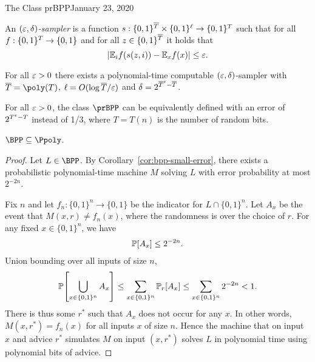 \begin{lecture}{1}{The Class prBPP}{January 23, 2020}


\begin{definition}
  An \emph{$(\varepsilon, \delta)$-sampler} is a function $s :
  \{0,1\}^{\overline{T}} \times \{0,1\}^\ell \to \{0,1\}^T$ such that for
  all $f : \{0,1\}^T \to \{0,1\}$ and for all $z \in
  \{0,1\}^{\overline{T}}$ it holds that \[
    |\mathbb{E}_i f(s(z, i)) - \mathbb{E}_x f(x)| \le \varepsilon.
  \]
\end{definition}

\begin{theorem}
  For all $\varepsilon > 0$ there exists a polynomial-time computable $(\varepsilon,
  \delta)$-sampler with $\overline{T} = \poly(T)$, $\ell = O(\log
  \overline{T}/\varepsilon)$ and $\delta = 2^{\overline{T}^\varepsilon - \overline{T}}$.
\end{theorem}


\begin{corollary}\label{cor:bpp-small-error}
  For all $\varepsilon > 0$, the class $\prBPP$ can be equivalently defined with an
  error of $2^{T^\varepsilon - T}$ instead of 1/3, where $T = T(n)$ is the number of
  random bits.
\end{corollary}

\begin{corollary}
  $\BPP \subseteq \Ppoly$.
\end{corollary}

\begin{proof}
    Let $L \in \BPP$. By Corollary~\ref{cor:bpp-small-error}, there exists a
    probabilistic polynomial-time machine $M$ solving $L$ with error
    probability at most $2^{-2n}$.

    Fix $n$ and let $f_n : \{0, 1\}^n \to \{0, 1\}$ be the indicator for $L
    \cap \{0, 1\}^n$. Let $A_x$ be the event that $M(x, r) \ne f_n(x)$, where
    the randomness is over the choice of $r$. For any fixed $x \in \{0, 1\}^n$,
    we have
    \begin{align*}
      \Pr\brac*{A_x} \leq 2^{-2n}.
    \end{align*}
    Union bounding over all inputs of size $n$, \[
      \Pr\brac*{\bigcup_{x \in \set{0, 1}^n} A_x}
      \leq \sum_{x \in \set{0,1}^n} \Pr_r\brac*{A_x}
      \leq \sum_{x \in \set{0,1}^n} 2^{-2n}
      < 1.
    \]
    There is thus some $r^*$ such that $A_x$ does not occur for any $x$. In
    other words, $M(x,r^*) = f_n(x)$ for all inputs $x$ of size $n$. Hence the
    machine that on input $x$ and advice $r^*$ simulates $M$ on input $(x,
    r^*)$ solves $L$ in polynomial time using polynomial bits of advice.
\end{proof}



\end{lecture}
